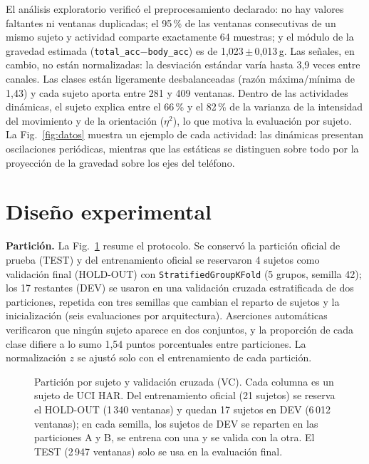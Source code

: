 \documentclass[runningheads]{llncs}
\begin{document}
El análisis exploratorio verificó el preprocesamiento declarado: no hay valores
faltantes ni ventanas duplicadas; el 95\,\% de las ventanas consecutivas de un
mismo sujeto y actividad comparte exactamente 64 muestras; y el módulo de la
gravedad estimada (\texttt{total\_acc}$-$\texttt{body\_acc}) es de
1,023\,$\pm$\,0,013\,g. Las señales, en cambio, no están normalizadas: la
desviación estándar varía hasta 3,9 veces entre canales. Las clases están
ligeramente desbalanceadas (razón máxima/mínima de 1,43) y cada sujeto aporta
entre 281 y 409 ventanas. Dentro de las actividades dinámicas, el sujeto explica
entre el 66\,\% y el 82\,\% de la varianza de la intensidad del movimiento y de la
orientación ($\eta^2$), lo que motiva la evaluación por sujeto. La
Fig.~\ref{fig:datos} muestra un ejemplo de cada actividad: las dinámicas
presentan oscilaciones periódicas, mientras que las estáticas se distinguen sobre
todo por la proyección de la gravedad sobre los ejes del teléfono.


\section{Diseño experimental}

\textbf{Partición.} La Fig.~\ref{fig:particion} resume el protocolo. Se conservó la
partición oficial de prueba (TEST) y del entrenamiento oficial se reservaron 4
sujetos como validación final (HOLD-OUT) con \texttt{StratifiedGroupKFold}
(5 grupos, semilla 42); los 17 restantes (DEV) se usaron en una validación
cruzada estratificada de dos particiones, repetida con tres semillas que cambian
el reparto de sujetos y la inicialización (seis evaluaciones por arquitectura).
Aserciones automáticas verificaron que ningún sujeto aparece en dos conjuntos, y
la proporción de cada clase difiere a lo sumo 1,54 puntos porcentuales entre
particiones. La normalización $z$ se ajustó solo con el entrenamiento de cada
partición.

\begin{figure}[H]
\centering

\caption{Partición por sujeto y validación cruzada (VC). Cada columna es un sujeto
de UCI HAR. Del entrenamiento oficial (21 sujetos) se reserva el HOLD-OUT (1\,340
ventanas) y quedan 17 sujetos en DEV (6\,012 ventanas); en cada semilla, los
sujetos de DEV se reparten en las particiones A y B, se entrena con una y se
valida con la otra. El TEST (2\,947 ventanas) solo se usa en la evaluación final.}
\label{fig:particion}
\end{figure}
\end{document}
